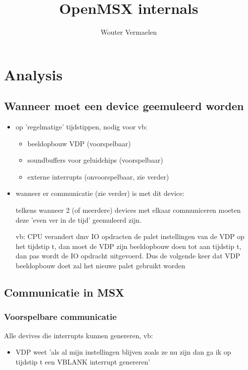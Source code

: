 \documentclass[11pt, a4paper]{report}
\title{OpenMSX internals}
\author{Wouter Vermaelen}
\begin{document}
\maketitle

\chapter{Analysis}

\section{Wanneer moet een device geemuleerd worden}

\begin{itemize}
\item op 'regelmatige' tijdstippen, nodig voor vb:
	\begin{itemize}
	\item beeldopbouw VDP (voorspelbaar)
	\item soundbuffers voor geluidchips (voorspelbaar)
	\item externe interrupts (onvoorspelbaar, zie verder)
	\end{itemize}
\item wanneer er communicatie (zie verder) is met dit device:

telkens wanneer 2 (of meerdere) devices met elkaar communiceren moeten deze
'even ver in de tijd' geemuleerd zijn. 

vb: CPU verandert dmv IO opdracten de palet instellingen van de VDP op het 
tijdstip t, dan moet de VDP zijn beeldopbouw doen tot aan tijdstip t, dan
pas wordt de IO opdracht uitgevoerd. Dus de volgende keer dat VDP 
beeldopbouw doet zal het nieuwe palet gebruikt worden
\end{itemize}


\section{Communicatie in MSX}

\subsection{Voorspelbare communicatie}

Alle devives die interrupts kunnen genereren, vb:
\begin{itemize}
\item VDP weet 'als al mijn instellingen blijven zoals ze nu zijn dan ga ik op 
tijdstip t een VBLANK interrupt genereren'
\end{itemize}
\end{document}
